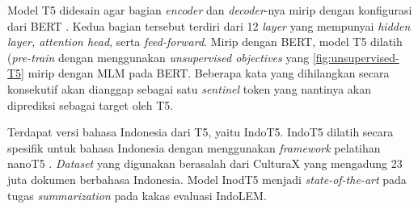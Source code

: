 Model T5 didesain agar bagian \textit{encoder} dan \textit{decoder}-nya mirip dengan konfigurasi dari BERT \parencite{T5}. Kedua bagian tersebut terdiri dari 12 \textit{layer} yang mempunyai \textit{hidden layer, attention head}, serta \textit{feed-forward}. Mirip dengan BERT, model T5 dilatih (\textit{pre-train} dengan menggunakan \textit{unsupervised objectives} yang \ref{fig:unsupervised-T5} mirip dengan MLM pada BERT. Beberapa kata yang dihilangkan secara konsekutif akan dianggap sebagai satu \textit{sentinel} token yang nantinya akan diprediksi sebagai target oleh T5.

Terdapat versi bahasa Indonesia dari T5, yaitu IndoT5. IndoT5 dilatih secara spesifik untuk bahasa Indonesia dengan menggunakan \textit{framework} pelatihan nanoT5 \parencite{indoT5}. \textit{Dataset} yang digunakan berasalah dari CulturaX yang mengadung 23 juta dokumen berbahasa Indonesia. Model InodT5 menjadi \textit{state-of-the-art} pada tugas \textit{summarization} pada kakas evaluasi IndoLEM.
